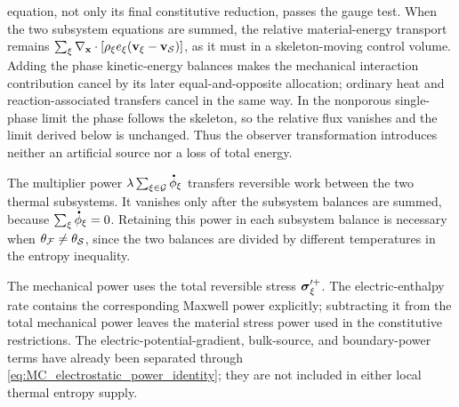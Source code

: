 equation, not only its final constitutive reduction, passes the gauge test.
When the two subsystem equations are summed, the relative material-energy
transport remains
\(\sum_\xi\nabla_{\mathbf{x}}\cdot[
\rho_\xi e_\xi(\mathbf{v}_\xi-\mathbf{v}_{\mathcal{S}})]\), as it must in a
skeleton-moving control volume.  Adding the phase kinetic-energy balances makes
the mechanical interaction contribution cancel by its later
equal-and-opposite allocation; ordinary heat and reaction-associated transfers
cancel in the same way.  In the nonporous single-phase limit the phase follows the
skeleton, so the relative flux vanishes and the limit derived below is
unchanged.  Thus the observer transformation introduces neither an artificial
source nor a loss of total energy.

The multiplier power
\(\lambda\sum_{\xi\in\mc G}\phasedot\phi_\xi\) transfers reversible work between the
two thermal subsystems.  It vanishes only after the subsystem balances are
summed, because \(\sum_\xi\phasedot\phi_\xi=0\).  Retaining this power in each
subsystem balance is necessary when
\(\theta_{\mathcal{F}}\ne\theta_{\mathcal{S}}\), since the two balances are divided by
different temperatures in the entropy inequality.

The mechanical power uses the total reversible stress
\(\boldsymbol{\sigma}_\xi^{\prime+}\).  The electric-enthalpy rate contains the
corresponding Maxwell power explicitly; subtracting it from the total
mechanical power leaves the material stress power used in the constitutive
restrictions.  The electric-potential-gradient, bulk-source, and boundary-power
terms have already been separated through
\eqref{eq:MC_electrostatic_power_identity}; they are not included in either
local thermal entropy supply.

